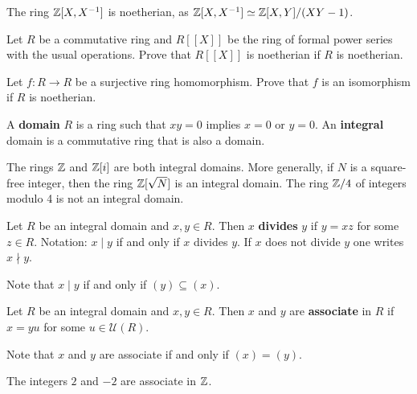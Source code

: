 \begin{example}
	The ring $\mathbb{Z}[X,X^{-1}]$ is noetherian, as $\mathbb{Z}[X,X^{-1}]\simeq\mathbb{Z}[X,Y]/(XY-1)$. 
\end{example}
 

\begin{exercise}
    Let $R$ be a commutative ring and $R[\![X]\!]$ be the ring of formal power series with the usual operations.  
	Prove that $R[\![X]\!]$ is noetherian if $R$ is noetherian. 	
\end{exercise}

\begin{exercise}
	Let $f\colon R\to R$ be a surjective ring homomorphism. Prove that $f$ is an isomorphism
	if $R$ is noetherian. 	
\end{exercise}


\begin{definition}
    A \textbf{domain} $R$ is a ring such that $xy=0$ implies $x=0$ or $y=0$. 
    An \textbf{integral} domain is a commutative ring that is also a domain. 
\end{definition}

The rings $\mathbb{Z}$ and $\mathbb{Z}[i]$ are both integral domains. 
More generally, if $N$ is a square-free integer, 
then the ring $\mathbb{Z}[\sqrt{N}]$ is an integral domain.  
The ring $\mathbb{Z}/4$ of 
integers modulo 4 is not an integral domain. 

\begin{definition}
	Let $R$ be an integral domain and $x,y\in R$. Then $x$ \textbf{divides} $y$ 
	if $y=xz$ for some $z\in R$. 
	Notation: $x\mid y$ if and only if $x$ divides $y$. If $x$ does not
	divide $y$ one writes $x\nmid y$.  
\end{definition}

Note that $x\mid y$ if and only if $(y)\subseteq (x)$.
	
\begin{definition}
	Let $R$ be an integral domain and $x,y\in R$. Then $x$ and $y$ are
	\textbf{associate} in $R$ if $x=yu$ for some $u\in\mathcal{U}(R)$. 
\end{definition}

Note that $x$ and $y$ are associate if and only if $(x)=(y)$.

\begin{example}
	The integers $2$ and $-2$ are associate in $\mathbb{Z}$.	
\end{example}

